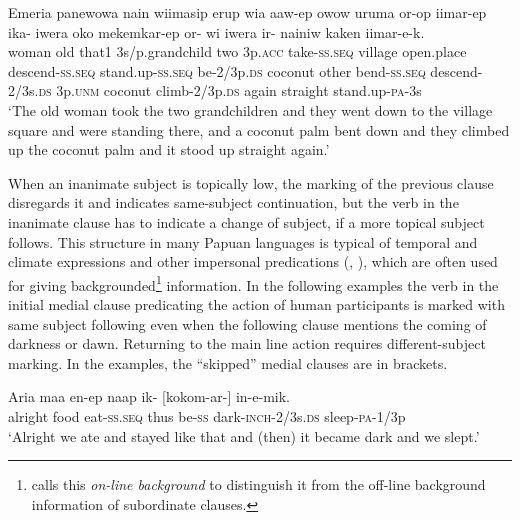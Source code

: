 \ea%
\label{ex:8:x1480}
\gll Emeria  panewowa  nain  wiimasip  erup  wia  aaw-ep owow  uruma  or-op  iimar-ep  ika- iwera  oko  mekemkar-ep  or-  wi  iwera ir-  nainiw  kaken  iimar-e-k.\\
woman  old  that1  3s/p.grandchild  two  3p.\textsc{acc} take-\textsc{ss}.\textsc{seq} village open.place descend-\textsc{ss}.\textsc{seq} stand.up-\textsc{ss}.\textsc{seq} be-2/3p.\textsc{ds} coconut  other  bend-\textsc{ss}.\textsc{seq} descend-2/3s.\textsc{ds} 3p.\textsc{unm} coconut climb-2/3p.\textsc{ds} again  straight  stand.up-\textsc{pa}-3s\\
\glt`The old woman took the two grandchildren and they went down to the village square and were standing there, and a coconut palm bent down and they climbed up the coconut palm and it stood up straight again.'
\z


When an inanimate subject is topically low, the  marking of the previous clause disregards it and indicates same-subject continuation, but the verb in the inanimate clause has to indicate a change of subject, if a more topical subject follows. This structure in many Papuan languages is typical of temporal and climate expressions and other impersonal predications (\citealt{Reesink1983a}, \citealt{Roberts1988b}), which are often used for giving backgrounded\footnote{\citet[244]{Farr1999} calls this \textit{on-line background} to distinguish it from the off-line background information of subordinate clauses.} information. In the following examples the verb in the initial medial clause predicating the action of human participants is marked with same subject following even when the following clause mentions the coming of darkness or dawn. Returning to the main line action requires different-subject marking. In the examples, the ``skipped'' medial clauses are in brackets.

\ea%
\label{ex:8:x1482}
\gll Aria  maa  en-ep  naap  ik-  [kokom-ar-] in-e-mik.\\
alright  food  eat-\textsc{ss}.\textsc{seq} thus be-\textsc{ss} dark-\textsc{inch}-2/3s.\textsc{ds} sleep-\textsc{pa}-1/3p\\
\glt`Alright we ate and stayed like that and (then) it became dark and we slept.'
\z


